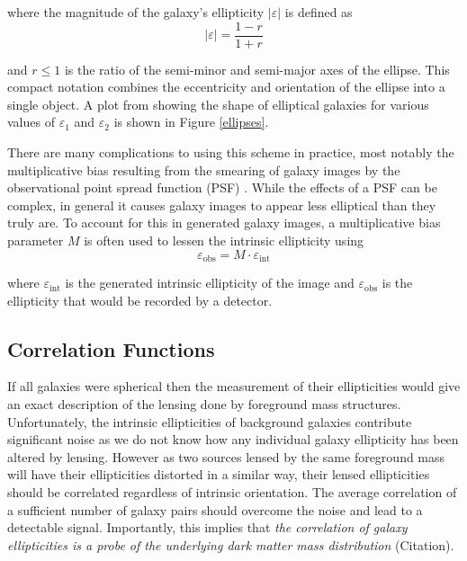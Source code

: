 \documentclass[%
 reprint,
 amsmath,amssymb,
 aps,nofootinbib
]{revtex4-1}
\begin{document}
\noindent where the magnitude of the galaxy's ellipticity $|\varepsilon|$ is defined as
\begin{equation}
|\varepsilon|=\frac{1-r}{1+r}
\end{equation}

\noindent and $r\leq1$ is the ratio of the semi-minor and semi-major axes of the ellipse. This compact notation combines the eccentricity and orientation of the ellipse into a single object. A plot from \cite{schneider} showing the shape of elliptical galaxies for various values of $\varepsilon_1$ and $\varepsilon_2$ is shown in Figure \ref{ellipses}.

There are many complications to using this scheme in practice, most notably the multiplicative bias resulting from the smearing of galaxy images by the observational point spread function (PSF) \cite{multiplicative_bias}. While the effects of a PSF can be complex, in general it causes galaxy images to appear less elliptical than they truly are. To account for this in generated galaxy images, a multiplicative bias parameter $M$ is often used to lessen the intrinsic ellipticity using
\begin{equation}\label{mult_bias}
\varepsilon_{\text{obs}}=M\cdot\varepsilon_{\text{int}}
\end{equation}

\noindent where $\varepsilon_{\text{int}}$ is the generated intrinsic ellipticity of the image and $\varepsilon_{\text{obs}}$ is the ellipticity that would be recorded by a detector.


\subsection{Correlation Functions} \label{corr_functions}

If all galaxies were spherical then the measurement of their ellipticities would give an exact description of the lensing done by foreground mass structures. Unfortunately, the intrinsic ellipticities of background galaxies contribute significant noise as we do not know how any individual galaxy ellipticity has been altered by lensing. However as two sources lensed by the same foreground mass will have their ellipticities distorted in a similar way, their lensed ellipticities should be correlated regardless of intrinsic orientation. The average correlation of a sufficient number of galaxy pairs should overcome the noise and lead to a detectable signal. Importantly, this implies that \textit{the correlation of galaxy ellipticities is a probe of the underlying dark matter mass distribution} (Citation).
\end{document}
